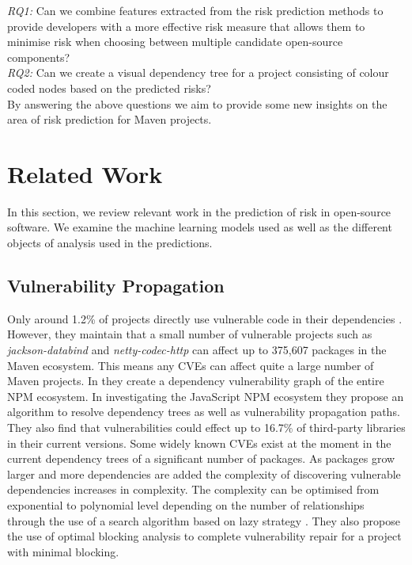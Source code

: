 \documentclass[conference]{IEEEtran}
\begin{document}
\textit{RQ1:} Can we combine features extracted from the risk prediction methods to provide developers with a more effective risk measure that allows them to minimise risk when choosing between multiple candidate open-source components?\\

\textit{RQ2:} Can we create a visual dependency tree for a project consisting of colour coded nodes based on the predicted risks?\\ 

By answering the above questions we aim to provide some new insights on the area of risk prediction for Maven projects. 

\section{Related Work}
In this section, we review relevant work in the prediction of risk in open-source software. We examine the machine learning models used as well as the different objects of analysis used in the predictions.  

\subsection{Vulnerability Propagation}
Only around 1.2\% of projects directly use vulnerable code in their dependencies \cite{a_m_mir_effect_2023}. However, they maintain that a small number of vulnerable projects such as \textit{jackson-databind} and \textit{netty-codec-http} can affect up to 375,607 packages in the Maven ecosystem. This means any CVEs can affect quite a large number of Maven projects. In \cite{c_liu_demystifying_2022} they create a dependency vulnerability graph of the entire NPM ecosystem. In investigating the JavaScript NPM ecosystem they propose an algorithm to resolve dependency trees as well as vulnerability propagation paths. They also find that vulnerabilities could effect up to 16.7\% of third-party libraries in their current versions. Some widely known CVEs exist at the moment in the current dependency trees of a significant number of packages. As packages grow larger and more dependencies are added the complexity of discovering vulnerable dependencies increases in complexity. The complexity can be optimised from exponential to polynomial level depending on the number of relationships through the use of a search algorithm based on lazy strategy \cite{w_hu_open_2019}. They also propose the use of optimal blocking analysis to complete vulnerability repair for a project with minimal blocking.
\end{document}
